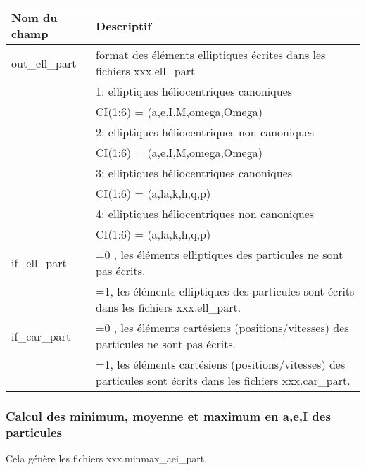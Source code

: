 \documentclass[11pt]{article}
\begin{document}
\begin{tabularx}{\textwidth}{|l|X|}
\hline
Nom du champ& Descriptif \\ \hline \hline
 out\_ell\_part & format des \'el\'ements elliptiques \'ecrites dans les fichiers xxx.ell\_part \\
&1:  elliptiques h\'eliocentriques canoniques\\
&	     CI(1:6) = (a,e,I,M,omega,Omega)\\
&2:  elliptiques h\'eliocentriques non canoniques\\
&	     CI(1:6) = (a,e,I,M,omega,Omega)\\
&3:  elliptiques h\'eliocentriques canoniques\\
&	     CI(1:6) = (a,la,k,h,q,p)\\
&4:  elliptiques h\'eliocentriques non canoniques\\
&	     CI(1:6) = (a,la,k,h,q,p)\\ \hline
 if\_ell\_part  & =0 , les \'el\'ements elliptiques des particules ne sont pas \'ecrits.\\
&=1, les \'el\'ements elliptiques  des particules sont \'ecrits dans les fichiers xxx.ell\_part.\\ \hline
 
 if\_car\_part  &  =0 , les \'el\'ements cart\'esiens (positions/vitesses)  des particules ne sont pas \'ecrits.\\
&=1, les \'el\'ements cart\'esiens (positions/vitesses)  des particules  sont \'ecrits dans les fichiers xxx.car\_part.\\ \hline 
 \end{tabularx}


\vspace{0.5cm}
\subsubsection*{Calcul des minimum, moyenne et maximum en a,e,I des particules}
Cela g\'en\`ere les fichiers xxx.minmax\_aei\_part.
\end{document}
